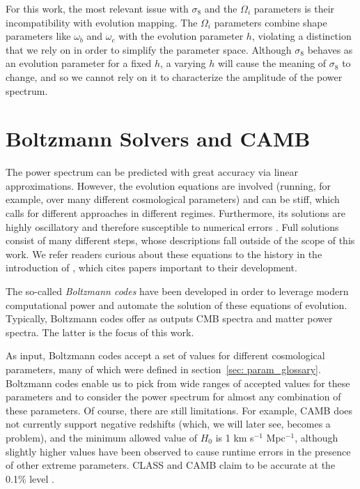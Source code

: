 For this work, the most relevant issue with $\sigma_8$ and the $\Omega_i$ 
parameters is their incompatibility with evolution mapping. The $\Omega_i$
parameters combine shape parameters like $\omega_b$ and $\omega_c$ with the
evolution parameter $h$, violating a distinction that we rely on in order
to simplify the parameter space. Although $\sigma_8$ behaves as an evolution
parameter for a fixed $h$, a varying $h$ will cause the meaning of $\sigma_8$
to change, and so we cannot rely on it to characterize the amplitude of the
power spectrum.


\section{Boltzmann Solvers and CAMB}
\label{sec: boltzmann_intro}


The power spectrum can be predicted with great accuracy via linear 
approximations. However, the evolution equations are involved (running, for
example, over many different cosmological parameters) and can be
stiff, which calls for different approaches in different regimes. Furthermore,
its solutions are highly oscillatory and therefore susceptible to numerical
errors . Full solutions consist of many different steps, whose
descriptions fall outside of the scope of this work. We refer readers curious
about these equations to the history in the introduction of \citet{Seljak},
which cites papers important to their development. 


The so-called \textit{Boltzmann codes} have been 
developed in order to leverage modern computational power and automate the
solution of these equations of evolution. Typically, Boltzmann codes offer as
outputs CMB spectra and matter power spectra. The latter is the focus of this
work.


As input, Boltzmann codes accept a set of values for different 
cosmological parameters, many of which were defined in section~\ref{sec: 
param_glossary}. Boltzmann codes enable us to pick from wide ranges of 
accepted values for these parameters and to consider the power 
spectrum for almost any combination of these parameters. Of course, there are 
still limitations. For example, CAMB does not currently support negative 
redshifts (which, we will later see, becomes a problem), and the minimum 
allowed value of $H_0$ is 1 km s$^{-1}$ Mpc$^{-1}$, although slightly higher 
values have 
been observed to cause runtime errors in the presence of other extreme 
parameters. CLASS and CAMB claim to be accurate at the 0.1\% level
.

